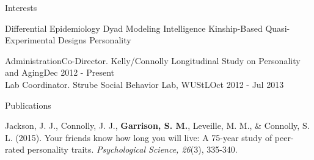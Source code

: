 \documentclass {resume}
\newlength{\wideitemsep}
\let\olditem\item
\renewcommand{\item}{\setlength{\itemsep}{\wideitemsep}\olditem}
\newcommand{\bigcdot}{\hspace* {-.8 mm}{\Large$\cdot$}\hspace* {.8 mm}}
\newcommand{\meb}{{\bf Garrison, S. M.}\xspace}
\begin{document}
\begin{rSection}{\textrm{Interests}} \begin{center}Differential Epidemiology \bigcdot Dyad Modeling \bigcdot Intelligence \bigcdot Kinship-Based Quasi-Experimental Designs \bigcdot Personality\end{center}
\end{rSection}

\begin{samepage}\begin{rSection}{\textrm{Administration}}Co-Director. Kelly/Connolly Longitudinal Study on Personality and Aging\hfill Dec 2012 - Present\smallskip\\
Lab Coordinator. Strube Social Behavior Lab,  WUStL\hfill Oct 2012 - Jul 2013\end{rSection}\end{samepage}%

\begin{rSection}{\textrm{Publications}}%
\begin{etaremune}\item Jackson, J. J., Connolly, J. J., \meb, Leveille, M. M., \& Connolly, S. L. (2015). Your friends know how long you will live: A 75-year study of peer-rated personality traits. \textit{Psychological Science, 26}(3),  335-340.\\ \href{http://pss.sagepub.com/content/early/2015/01/12/0956797614561800.full}{\color{blue}{doi:10.1177/0956797614561800}}
\end{etaremune}\end{rSection}%
\end{document}
